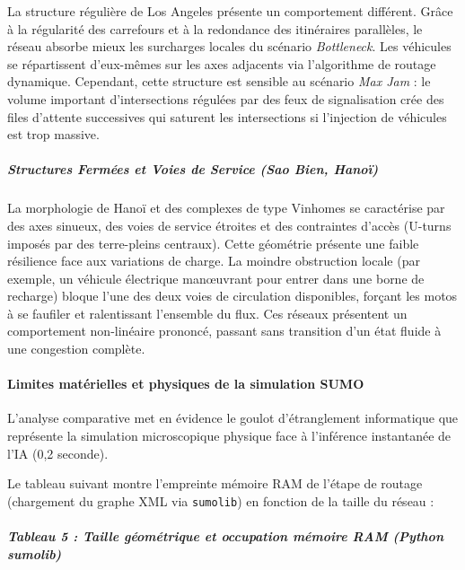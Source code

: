 \documentclass[10pt, a4paper]{article}
\begin{document}
La structure régulière de Los Angeles présente un comportement
différent. Grâce à la régularité des carrefours et à la redondance des
itinéraires parallèles, le réseau absorbe mieux les surcharges locales
du scénario \emph{Bottleneck}. Les véhicules se répartissent d'eux-mêmes
sur les axes adjacents via l'algorithme de routage dynamique. Cependant,
cette structure est sensible au scénario \emph{Max Jam} : le volume
important d'intersections régulées par des feux de signalisation crée
des files d'attente successives qui saturent les intersections si
l'injection de véhicules est trop massive.

\subparagraph{Structures Fermées et Voies de Service (Sao Bien,
Hanoï)}\label{structures-fermuxe9es-et-voies-de-service-sao-bien-hanouxef}

La morphologie de Hanoï et des complexes de type Vinhomes se caractérise
par des axes sinueux, des voies de service étroites et des contraintes
d'accès (U-turns imposés par des terre-pleins centraux). Cette géométrie
présente une faible résilience face aux variations de charge. La moindre
obstruction locale (par exemple, un véhicule électrique manœuvrant pour
entrer dans une borne de recharge) bloque l'une des deux voies de
circulation disponibles, forçant les motos à se faufiler et ralentissant
l'ensemble du flux. Ces réseaux présentent un comportement non-linéaire
prononcé, passant sans transition d'un état fluide à une congestion
complète.

\paragraph{Limites matérielles et physiques de la simulation
SUMO}\label{limites-matuxe9rielles-et-physiques-de-la-simulation-sumo}

L'analyse comparative met en évidence le goulot d'étranglement
informatique que représente la simulation microscopique physique face à
l'inférence instantanée de l'IA (0,2 seconde).

Le tableau suivant montre l'empreinte mémoire RAM de l'étape de routage
(chargement du graphe XML via \texttt{sumolib}) en fonction de la taille
du réseau :

\subparagraph{Tableau 5 : Taille géométrique et occupation mémoire RAM
(Python
sumolib)}\label{tableau-5-taille-guxe9omuxe9trique-et-occupation-muxe9moire-ram-python-sumolib}
\end{document}
